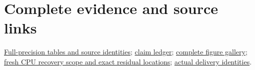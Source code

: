 \documentclass[11pt]{article}
\begin{document}
\section*{Complete evidence and source links}
\href{TABLE_INDEX.json}{Full-precision tables and source identities}; \href{CLAIM_LEDGER.jsonl}{claim ledger}; \href{FIGURE_GALLERY.md}{complete figure gallery}; \href{FRESH_CPU_RESTORE_CHECK.json}{fresh CPU recovery scope and exact residual locations}; \href{FINAL_RECEIPT.json}{actual delivery identities}.
\end{document}
